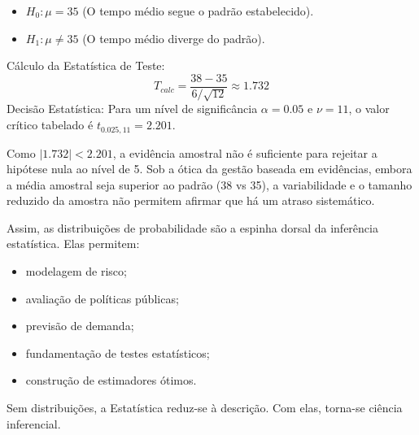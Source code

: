 \begin{itemize}
    \item $H_0: \mu = 35$ (O tempo médio segue o padrão estabelecido). 
    \item $H_1: \mu \neq 35$ (O tempo médio diverge do padrão). 
\end{itemize}

Cálculo da Estatística de Teste:$$T_{calc} = \frac{38 - 35}{6/\sqrt{12}} \approx 1.732$$Decisão Estatística: Para um nível de significância $\alpha=0.05$ e $\nu = 11$, o valor crítico tabelado é $t_{0.025,11} = 2.201$. \vskip0.3cm

Como $|1.732| < 2.201$, a evidência amostral não é suficiente para rejeitar a hipótese nula ao nível de 5. Sob a ótica da gestão baseada em evidências, embora a média amostral seja superior ao padrão (38 vs 35), a variabilidade e o tamanho reduzido da amostra não permitem afirmar que há um atraso sistemático. 


\newpage
Assim, as distribuições de probabilidade são a espinha dorsal da inferência estatística. Elas permitem: 

\begin{itemize}
\item modelagem de risco;
\item avaliação de políticas públicas;
\item previsão de demanda;
\item fundamentação de testes estatísticos;
\item construção de estimadores ótimos.
\end{itemize} \vskip0.3cm

Sem distribuições, a Estatística reduz-se à descrição. Com elas, torna-se ciência inferencial.